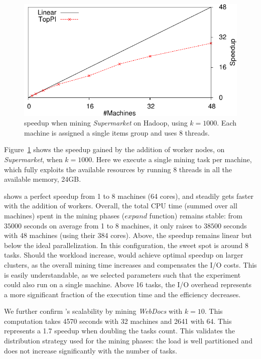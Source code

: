 \begin{figure}
	\centering
	\includegraphics[]{fig/toppi/hadoop-speedup/supermarket-s2-k1000-t8.pdf}
	\caption{\label{fig:hadoopSpeedupGlobal}
		\toppi speedup when mining \textit{Supermarket} on Hadoop,
		using $k=1000$.
		Each machine is assigned a single items group and uses 8 threads.
	}
\end{figure}

Figure~\ref{fig:hadoopSpeedupGlobal} shows the speedup gained by the addition of worker nodes,
on \textit{Supermarket}, when $k=1000$.
Here we execute a single mining task per machine,
which fully exploits the available resources by running 8 threads in all the available memory, 24GB.

\toppi shows a perfect speedup from 1 to 8 machines (64 cores),
and steadily gets faster with the addition of workers.
Overall, the total CPU time (summed over all machines) spent in the mining phases ($\mathit{expand}$ function) remains stable:
from $\num{35000}$ seconds on average from 1 to 8 machines,
it only raises to $\num{38500}$ seconds with 48 machines (using their 384 cores).
Above, the speedup remains linear but below the ideal parallelization.
In this configuration, the sweet spot is around 8 tasks.
Should the workload increase,
\toppi would achieve optimal speedup on larger clusters,
as the overall mining time increases and compensates the I/O costs.
This is easily understandable,
as we selected parameters such that the experiment could also run on a single machine.
Above 16 tasks,
the I/O overhead represents a more significant fraction of the execution time and the efficiency decreases.

We further confirm \toppi's scalability by mining \emph{WebDocs} with $k=10$.
This computation takes \num{4570} seconds with 32 machines and \num{2641} with 64.
This represents a 1.7 speedup when doubling the tasks count.
This validates the distribution strategy used for the mining phases:
the load is well partitioned and does not increase significantly with the number of tasks.

